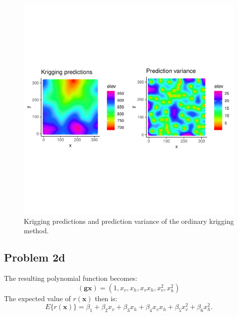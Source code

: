 \documentclass[]{article}
\newcommand{\vect}[1]{\ensuremath{\boldsymbol{\mathbf{#1}}}}
\begin{document}
\begin{figure}
\centering
\includegraphics{Exercise_1_files/figure-latex/fig3-1.pdf}
\caption{\label{fig:fig3} Krigging predictions and prediction variance
of the ordinary krigging method.}
\end{figure}

\subsection{Problem 2d}\label{problem-2d}

The resulting polynomial function becomes: \[
\vect{(gx)} = (1, x_v, x_h, x_vx_h, x_v^2, x_h^2)
\] The expected value of \(r(\vect{x})\) then is: \[
E \{r(\vect{x}) \} = \beta_1 + \beta_2x_v + \beta_3x_h + \beta_4x_vx_h + \beta_5x_v^2 + \beta_6x_h^2 .
\]
\end{document}
